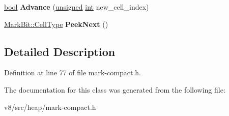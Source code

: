 \begin{DoxyCompactItemize}
\item 
\mbox{\label{classv8_1_1internal_1_1MarkBitCellIterator_ac4eb9adce6d7b05c99750ea7f508f657}} 
\mbox{\hyperlink{classbool}{bool}} {\bfseries Advance} (\mbox{\hyperlink{classunsigned}{unsigned}} \mbox{\hyperlink{classint}{int}} new\+\_\+cell\+\_\+index)
\item 
\mbox{\label{classv8_1_1internal_1_1MarkBitCellIterator_a8b5da1339f055cef5c2e958bc831952a}} 
\mbox{\hyperlink{classuint32__t}{Mark\+Bit\+::\+Cell\+Type}} {\bfseries Peek\+Next} ()
\end{DoxyCompactItemize}


\subsection{Detailed Description}


Definition at line 77 of file mark-\/compact.\+h.



The documentation for this class was generated from the following file\+:\begin{DoxyCompactItemize}
\item 
v8/src/heap/mark-\/compact.\+h\end{DoxyCompactItemize}
